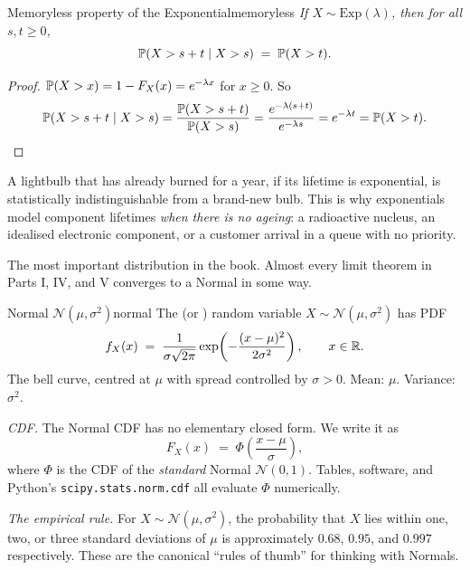 \begin{proposition}{Memoryless property of the Exponential}{memoryless}
\textit{If $X \sim \mathrm{Exp}(\lambda)$, then for all $s, t \ge 0$,}
\[
\mathbb{P}(X > s + t \mid X > s) \;=\; \mathbb{P}(X > t).
\]
\end{proposition}

\begin{proof}
$\mathbb{P}(X > x) = 1 - F_X(x) = e^{-\lambda x}$ for $x \ge 0$. So
\[
\mathbb{P}(X > s + t \mid X > s) = \frac{\mathbb{P}(X > s + t)}{\mathbb{P}(X > s)} = \frac{e^{-\lambda(s + t)}}{e^{-\lambda s}} = e^{-\lambda t} = \mathbb{P}(X > t). \qedhere
\]
\end{proof}

\begin{intuition}
A lightbulb that has already burned for a year, if its lifetime is exponential, is statistically indistinguishable from a brand-new bulb. This is why exponentials model component lifetimes \emph{when there is no ageing}: a radioactive nucleus, an idealised electronic component, or a customer arrival in a queue with no priority.
\end{intuition}



The most important distribution in the book. Almost every limit theorem in Parts I, IV, and V converges to a Normal in some way.

\begin{example}{Normal $\mathcal{N}(\mu, \sigma^2)$}{normal}
The  (or ) random variable $X \sim \mathcal{N}(\mu, \sigma^2)$ has PDF
\[
f_X(x) \;=\; \frac{1}{\sigma \sqrt{2\pi}} \exp\!\left( -\frac{(x - \mu)^2}{2\sigma^2} \right), \qquad x \in \mathbb{R}.
\]
The bell curve, centred at $\mu$ with spread controlled by $\sigma > 0$. Mean: $\mu$. Variance: $\sigma^2$.

\textit{CDF.} The Normal CDF has no elementary closed form. We write it as
\[
F_X(x) \;=\; \Phi\!\left(\frac{x - \mu}{\sigma}\right),
\]
where $\Phi$ is the CDF of the \emph{standard} Normal $\mathcal{N}(0, 1)$. Tables, software, and Python's \texttt{scipy.stats.norm.cdf} all evaluate $\Phi$ numerically.

\textit{The empirical rule.} For $X \sim \mathcal{N}(\mu, \sigma^2)$, the probability that $X$ lies within one, two, or three standard deviations of $\mu$ is approximately $0.68$, $0.95$, and $0.997$ respectively. These are the canonical ``rules of thumb'' for thinking with Normals.
\end{example}

